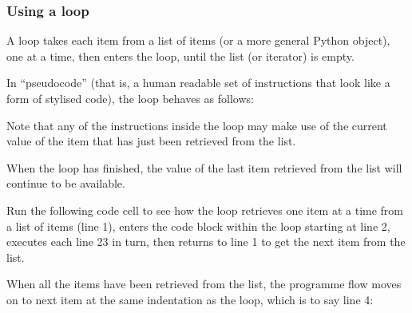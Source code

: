 \documentclass[letterpaper,10pt,english]{sphinxmanual}
\begin{document}
\subsubsection{Using a  loop}
\label{\detokenize{content/02_Robot_Lab/Section_00_01:Using-a-for...in...-loop}}
A  loop takes each item from a list of items (or a more general Python  object), one at a time, then enters the loop, until the list (or iterator) is empty.

In “pseudo\sphinxhyphen{}code” (that is, a human readable set of instructions that look like a form of stylised code), the  loop behaves as follows:

\begin{sphinxVerbatim}[commandchars=\\\{\}]
               


   

   

   

\end{sphinxVerbatim}

Note that any of the instructions inside the loop may make use of the current value of the item that has just been retrieved from the list.

When the loop has finished, the value of the last item retrieved from the list will continue to be available.

Run the following code cell to see how the  loop retrieves one item at a time from a list of items (line 1), enters the code block within the loop starting at line 2, executes each line 2\sphinxhyphen{}3 in turn, then returns to line 1 to get the next item from the list.

When all the items have been retrieved from the list, the programme flow moves on to next item at the same indentation as the  loop, which is to say line 4:
\end{document}

